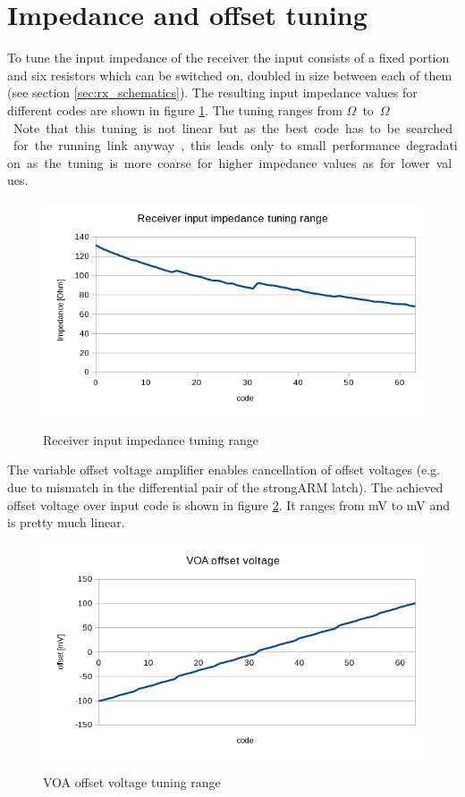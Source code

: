 \section{Impedance and offset tuning}

To tune the input impedance of the receiver the input consists of a fixed portion and six resistors which can be switched on, doubled in size between each of them (see section \ref{sec:rx_schematics}). The resulting input impedance values for different codes are shown in figure \ref{fig:rx_imp_tuning_range}. The tuning ranges from \unit[70]{$\Omega$} to \unit[130]{$\Omega$}. Note that this tuning is not linear but as the best code has to be searched for the running link anyway, this leads only to small performance degradation as the tuning is more coarse for higher impedance values as for lower values.

\begin{figure}[H]
  \centering
  {\includegraphics[scale=0.9]{plots/rx_inp_imp.png}}
  \caption{Receiver input impedance tuning range}
  \label{fig:rx_imp_tuning_range}
\end{figure}

The variable offset voltage amplifier enables cancellation of offset voltages (e.g. due to mismatch in the differential pair of the strongARM latch). The achieved offset voltage over input code is shown in figure \ref{fig:voa_offset}. It ranges from \unit[-100]{mV} to \unit[100]{mV} and is pretty much linear.

\begin{figure}[H]
  \centering
  {\includegraphics[scale=0.9]{plots/voa_offset.png}}
  \caption{VOA offset voltage tuning range}
  \label{fig:voa_offset}
\end{figure}
